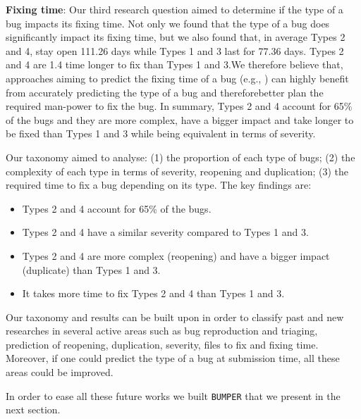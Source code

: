 {\bf Fixing time}: Our third research question aimed to determine
if the type of a bug impacts its fixing time. Not only we found
that the type of a bug does significantly impact its fixing time,
but we also found that, in average Types 2 and 4, stay open
111.26 days while Types 1 and 3 last for 77.36 days. Types 2
and 4 are 1.4 time longer to fix than Types 1 and 3.We
therefore believe that, approaches aiming to predict the fixing
time of a bug (e.g., \cite{Panjer2007,Bhattacharya2011,Zhang2013}) can highly benefit from
accurately predicting the type of a bug and thereforebetter
plan the required man-power to fix the bug.
In summary, Types 2 and 4 account for 65\% of the bugs
and they are more complex, have a bigger impact and take
longer to be fixed than Types 1 and 3 while being equivalent
in terms of severity.

Our taxonomy aimed to analyse: (1) the
proportion of each type of bugs; (2) the complexity of each
type in terms of severity, reopening and duplication; (3) the
required time to fix a bug depending on its type. The key
findings are:
\begin{itemize}
  \item Types 2 and 4 account for 65\% of the bugs.
  \item Types 2 and 4 have a similar severity compared to
Types 1 and 3.
  \item Types 2 and 4 are more complex (reopening) and have
a bigger impact (duplicate) than Types 1 and 3.
  \item It takes more time to fix Types 2 and 4 than Types 1
and 3.
\end{itemize}

Our taxonomy and results can be built upon in order to classify
past and new researches in several active areas such as bug
reproduction and triaging, prediction of reopening,
duplication, severity, files to fix and fixing time. Moreover, if
one could predict the type of a bug at submission time, all
these areas could be improved.

In order to ease all these future works we built {\tt BUMPER} that we present in the next section.
